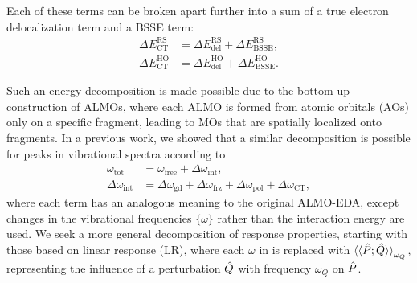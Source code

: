 \documentclass[%
  class = book,%
  crop = false,%
  float = true,%
  multi = true,%
  preview = false,%
]{standalone}
\begin{document}
Each of these terms can be broken apart further into a sum of a true electron delocalization term and a BSSE term:
\begin{equation}
  \begin{aligned}
    \label{eq:almo-eda-ct-bsse}
    \Delta E_{\text{CT}}^{\text{RS}} &= \Delta E_{\text{del}}^{\text{RS}} + \Delta E_{\text{BSSE}}^{\text{RS}}, \\
    \Delta E_{\text{CT}}^{\text{HO}} &= \Delta E_{\text{del}}^{\text{HO}} + \Delta E_{\text{BSSE}}^{\text{HO}}.
  \end{aligned}
\end{equation}

Such an energy decomposition is made possible due to the bottom-up construction of ALMOs, where each ALMO is formed from atomic orbitals (AOs) only on a specific fragment, leading to MOs that are spatially localized onto fragments. In a previous work\cite{Brinzer2015}, we showed that a similar decomposition is possible for peaks in vibrational spectra according to
\begin{equation}
  \begin{aligned}
    \label{eq:almo-frequencies}
    \omega_{\text{tot}} &= \omega_{\text{free}} + \Delta \omega_{\text{int}}, \\
    \Delta \omega_{\text{int}} &= \Delta \omega_{\text{gd}} + \Delta \omega_{\text{frz}} + \Delta \omega_{\text{pol}} + \Delta \omega_{\text{CT}},
  \end{aligned}
\end{equation}
where each term has an analogous meaning to the original ALMO-EDA, except changes in the vibrational frequencies \(\{\omega\}\) rather than the interaction energy are used. We seek a more general decomposition of response properties, starting with those based on linear response (LR), where each \(\omega\) in  is replaced with \(\braket{\braket{\hat{P}; \hat{Q}}}_{\omega_{Q}}\), representing the influence of a perturbation \(\hat{Q}\) with frequency \(\omega_{Q}\) on \(\hat{P}\).
\end{document}

